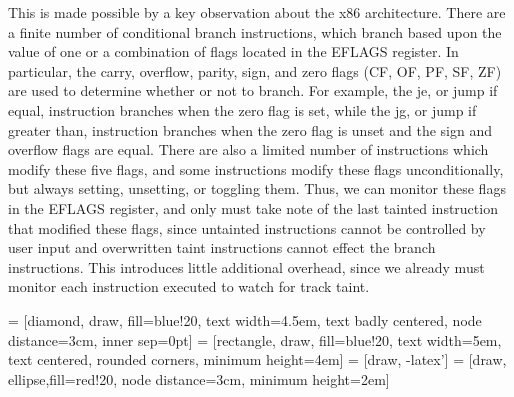 \documentclass[11pt,expanded,copyright]{fsuthesis}
\begin{document}
This is made possible by a key observation about the x86 architecture. There are a finite number of conditional branch instructions, which branch based upon the value of one or a combination of flags located in the EFLAGS register. In particular, the carry, overflow, parity, sign, and zero flags (CF, OF, PF, SF, ZF) are used to determine whether or not to branch. For example, the je, or jump if equal, instruction branches when the zero flag is set, while the jg, or jump if greater than, instruction branches when the zero flag is unset and the sign and overflow flags are equal. There are also a limited number of instructions which modify these five flags, and some instructions modify these flags unconditionally, but always setting, unsetting, or toggling them. Thus, we can monitor these flags in the EFLAGS register, and only must take note of the last tainted instruction that modified these flags, since untainted instructions cannot be controlled by user input and overwritten taint instructions cannot effect the branch instructions. This introduces little additional overhead, since we already must monitor each instruction executed to watch for track taint.



 = [diamond, draw, fill=blue!20, 
    text width=4.5em, text badly centered, node distance=3cm, inner sep=0pt]
 = [rectangle, draw, fill=blue!20, 
    text width=5em, text centered, rounded corners, minimum height=4em]
 = [draw, -latex']
 = [draw, ellipse,fill=red!20, node distance=3cm,
    minimum height=2em]
    
\end{document}
